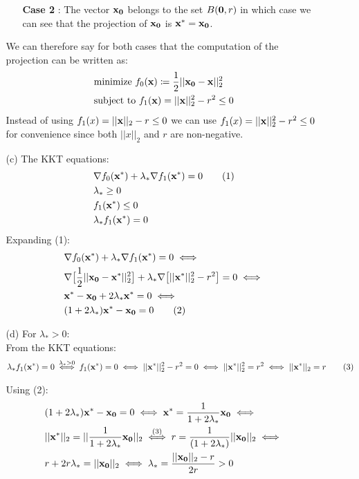 \documentclass[12pt]{article}
\newcommand\numberthis{\addtocounter{equation}{1}\tag{\theequation}}
\begin{document}
\begin{enumerate}
\begin{enumerate}
\begin{enumerate}
				\item[\bf Case 2]:
				The vector ${\bf x_0}$ belongs to the set $B({\bf 0},r)$ in which case we can see that the projection of ${\bf x_0}$ is ${\bf x^*}={\bf x_0}$.
			\end{enumerate}
			We can therefore say for both cases that the computation of the projection can be written as:
			\begin{align*}
				&\text{minimize }f_0({\bf x})\coloneqq \frac{1}{2}||{\bf x_0}-{\bf x}||_2^2\\
				&\text{subject to }f_1({\bf x})=||{\bf x}||_2^2-r^2\leq 0 
			\end{align*}
			Instead of using $f_1(x)=||{\bf x}||_2-r\leq 0$ we can use  $f_1(x)=||{\bf x}||_2^2-r^2\leq 0$ for convenience since both $||x||_2$ and $r$ are non-negative.
			
			\item[(c)]
			The KKT equations:
			\begin{align*}
				&\nabla f_0({\bf x^*})+\lambda_*\nabla f_1({\bf x^*})=0 \numberthis \\
				&\lambda_*\geq0\\
				&f_1({\bf x^*})\leq 0\\
				&\lambda_*f_1({\bf x^*})=0
			\end{align*}
			Expanding (1):
			\begin{align*}
				&\nabla f_0({\bf x^*})+\lambda_*\nabla f_1({\bf x^*})=0 \iff\\
				&\nabla\big[\frac{1}{2}||{\bf x_0}-{\bf x^*}||_2^2\big]  +\lambda_*\nabla\big[||{\bf x^*}||_2^2-r^2\big]=0 \iff \\
				&{\bf x^*}-{\bf x_0}+2\lambda_*{\bf x^*}=0 \iff\\
				&(1+2\lambda_*){\bf x^*}-{\bf x_0}=0 \numberthis
			\end{align*}
		
			\item[(d)] 
			For $\lambda_*>0$:\\
			From the KKT equations: 
			\begin{align*}
				\lambda_*f_1({\bf x^*})=0 \overset{\lambda_*>0}{\iff}f_1({\bf x^*})=0 \iff ||{\bf x^*}||_2^2-r^2=0 \iff ||{\bf x^*}||_2^2=r^2 \iff ||{\bf x^*}||_2=r\numberthis
			\end{align*}
		
			Using (2):
			\begin{align*}
				&(1+2\lambda_*){\bf x^*}-{\bf x_0}=0 \iff {\bf x^*}=\frac{1}{1+2\lambda_*}{\bf x_0}\iff\\
				&||{\bf x^*}||_2=||\frac{1}{1+2\lambda_*}{\bf x_0}||_2 \overset{(3)}{\iff} r = \frac{1}{(1+2\lambda_*)}||{\bf x_0}||_2\iff\\
				&r+2r\lambda_*=||{\bf x_0}||_2 \iff \lambda_*=\frac{||{\bf x_0}||_2-r}{2r}>0
			\end{align*}
			

\end{enumerate}
\end{enumerate}
\end{document}

